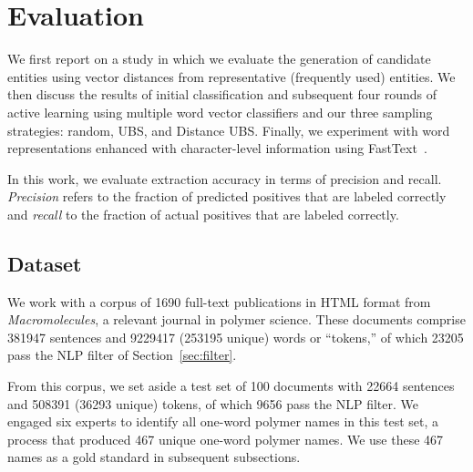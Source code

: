 \section{Evaluation}
\label{sect:apner_results}
We first report on a study in which we evaluate the generation of candidate entities using vector distances from representative (frequently used) entities. 
We then discuss the results of initial classification and subsequent four rounds of active learning using multiple word vector classifiers and our three sampling strategies: random, UBS, and Distance UBS.
Finally, we experiment with word representations enhanced with character-level information using FastText~\cite{bojanowski2016enriching,joulin2016bag}.

In this work, we evaluate extraction accuracy in terms of precision and recall.
\emph{Precision} refers to the fraction of predicted
positives that are labeled correctly and
\emph{recall} to the fraction of actual positives that
are labeled correctly.

\subsection{Dataset}

We work with a corpus of \num{1690} full-text publications in HTML format from \textit{Macromolecules}, 
a relevant journal in polymer science.
These documents comprise \num{381947} sentences and \num{9229417} (\num{253195} unique) words or ``tokens,''
of which \num{23205} pass the NLP filter of Section~\ref{sec:filter}.

From this corpus, 
we set aside a test set of 100 documents with  \num{22664} sentences and \num{508391} (\num{36293} unique) tokens,
of which \num{9656} pass the NLP filter.
We engaged six experts to identify all one-word polymer names in this test set,
a process that produced 467 unique one-word polymer names.
We use these 467 names as a gold standard in subsequent subsections.

